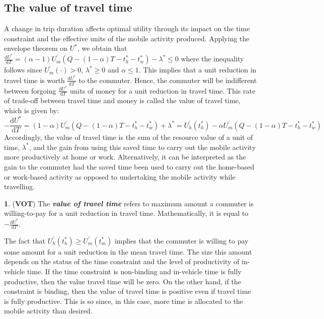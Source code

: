 \documentclass[12pt,a4paper,british]{article}
\theoremstyle{definition}
\newtheorem{defn}{\protect\definitionname}
\theoremstyle{plain}
\theoremstyle{plain}
\providecommand{\definitionname}{Definition}
\begin{document}
\subsection{The value of travel time}

A change in trip duration affects optimal utility through its impact on the time constraint and the effective units of the mobile activity produced. Applying the envelope theorem on $U^{\ast}$, we obtain that $\frac{\mathrm{d}U^{\ast}}{\mathrm{d}T}=\left(\alpha-1\right)U_{m}^{\prime}\left(Q-\left(1-\alpha\right)T-t_{h}^{\ast}-t_{w}^{\ast}\right)-\lambda^{\ast}\leq0$ where the inequality follows since $U_{m}^{\prime}\left(\cdot\right)>0$, $\lambda^{\ast}\geq0$ and $\alpha\leq1$. This implies that a unit reduction in travel time is worth $\frac{\mathrm{d}U^{\ast}}{\mathrm{d}T}$ to the commuter. Hence, the commuter will be indifferent between forgoing
$\frac{\mathrm{d}U^{\ast}}{\mathrm{d}T}$ units of money for a unit reduction in travel time. This rate of trade-off between travel time
and money is called the value of travel time, which is given by:%
\begin{equation}
-\frac{\mathrm{d}U^{\ast}}{\mathrm{d}T}=\left(1-\alpha\right)U_{m}^{\prime}\left(Q-\left(1-\alpha\right)T-t_{h}^{\ast}-t_{w}^{\ast}\right)+\lambda^{\ast}=U_{h}^{\prime}\left(t_{h}^{*}\right)-\alpha U_{m}^{\prime}\left(Q-\left(1-\alpha\right)T-t_{h}^{\ast}-t_{w}^{\ast}\right)\label{eq:VOT_det}
\end{equation}
Accordingly, the value of travel time is the sum of the resource value of a unit of time, $\lambda^{\ast}$, and the gain from using this
saved time to carry out the mobile activity more productively at home or work. Alternatively, it can be interpreted as the gain to the commuter had the saved time been used to carry out the home-based or work-based activity as opposed to undertaking the mobile activity while travelling.

\begin{defn}
(\textbf{VOT}) The \textbf{\textit{value of travel time}} refers to
maximum amount a commuter is willing-to-pay for a unit reduction in
travel time. Mathematically, it is equal to $-\frac{\mathrm{d}U^{\ast}}{\mathrm{d}T}$.
\end{defn}

The fact that $U_{h}^{\prime}\left(t_{h}^{*}\right)\geq U_{m}^{\prime}\left(t_{m}^{\ast}\right)$ implies that the commuter is willing to pay some amount for a unit reduction in the mean travel time. The size this amount depends on the status of the time constraint and the level of productivity of in-vehicle time. If the time constraint is non-binding and in-vehicle time is fully productive, then the value travel time will be zero. On the other hand, if the constraint is binding, then the value of travel time is positive even if travel time is fully productive. This is so since, in this case, more time is allocated to the mobile activity than desired. 
\end{document}
